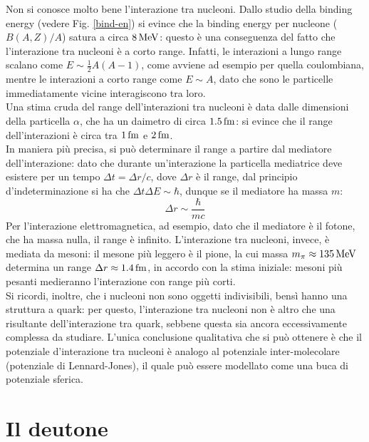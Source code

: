 Non si conosce molto bene l'interazione tra nucleoni. Dallo studio della binding energy (vedere Fig. \ref{bind-en}) si evince che la binding energy per nucleone ($ B(A,Z)/A $) satura a circa $ 8\,\mathrm{MeV} $: questo è una conseguenza del fatto che l'interazione tra nucleoni è a corto range. Infatti, le interazioni a lungo range scalano come $ E \sim \frac{1}{2} A (A - 1) $, come avviene ad esempio per quella coulombiana, mentre le interazioni a corto range come $ E \sim A $, dato che sono le particelle immediatamente vicine interagiscono tra loro.\\
Una stima cruda del range dell'interazioni tra nucleoni è data dalle dimensioni della particella $ \alpha $, che ha un daimetro di circa $ 1.5\,\mathrm{fm} $: si evince che il range dell'interazioni è circa tra $ 1\,\mathrm{fm} $ e $ 2\,\mathrm{fm} $.\\
In maniera più precisa, si può determinare il range a partire dal mediatore dell'interazione: dato che durante un'interazione la particella mediatrice deve esistere per un tempo $ \Delta t = \Delta r / c $, dove $ \Delta r $ è il range, dal principio d'indeterminazione si ha che $ \Delta t \Delta E \sim \hbar $, dunque se il mediatore ha massa $ m $:
\begin{equation}
	\Delta r \sim \frac{\hbar}{m c}
	\label{eq:4.5}
\end{equation}
Per l'interazione elettromagnetica, ad esempio, dato che il mediatore è il fotone, che ha massa nulla, il range è infinito. L'interazione tra nucleoni, invece, è mediata da mesoni: il mesone più leggero è il pione, la cui massa $ m_{\pi} \approx 135\,\mathrm{MeV} $ determina un range $ \Delta r \approx 1.4 \,\mathrm{fm} $, in accordo con la stima iniziale: mesoni più pesanti medieranno l'interazione con range più corti.\\
Si ricordi, inoltre, che i nucleoni non sono oggetti indivisibili, bensì hanno una struttura a quark: per questo, l'interazione tra nucleoni non è altro che una risultante dell'interazione tra quark, sebbene questa sia ancora eccessivamente complessa da studiare. L'unica conclusione qualitativa che si può ottenere è che il potenziale d'interazione tra nucleoni è analogo al potenziale inter-molecolare (potenziale di Lennard-Jones), il quale può essere modellato come una buca di potenziale sferica.

\section{Il deutone}

